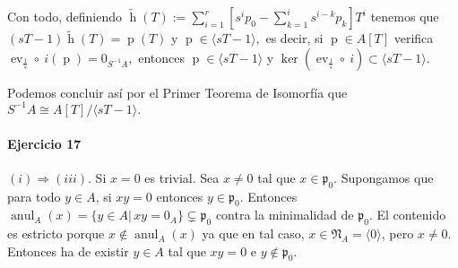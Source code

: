 \documentclass[./ejercicios.tex]{subfiles}
\begin{document}
Con todo, definiendo $\widetilde{\operatorname{h}}(T):=\sum_{i=1}^r\left[s^ip_0-\sum_{k=1}^is^{i-k}p_k\right]T^i$ tenemos que $(sT-1)\widetilde{\operatorname{h}}(T)=\operatorname{p}(T)$ y $\operatorname{p}\in\langle sT-1\rangle,$ es decir, si $\operatorname{p}\in A[T]$ verifica $\operatorname{ev}_{\frac{1}{s}}\circ\ i(\operatorname{p})=0_{S^{-1}A},$ entonces $\operatorname{p}\in \langle sT-1\rangle$ y $\ker(\operatorname{ev}_{\frac{1}{s}}\circ\ i)\subset\langle sT-1\rangle.$

Podemos concluir así por el Primer Teorema de Isomorfía que $S^{-1}A\cong A[T]/\langle sT-1\rangle.$
%
%
%
%
%

\paragraph{Ejercicio 17}
$(i)\Rightarrow (iii)$. Si $x = 0$ es trivial. Sea $x\neq 0$ tal que $x\in \mathfrak{p}_0$. Supongamos que para todo $y\in  A$, si $xy = 0$ entonces $y \in \mathfrak{p}_0$. Entonces $\operatorname{anul}_A(x) = \{y \in A \vert \, xy = 0_A\} \subsetneq \mathfrak{p}_0$ contra la minimalidad de $\mathfrak{p}_0$.
El contenido es estricto porque $x \not \in \operatorname{anul}_A(x)$ ya que en tal caso, $x \in \mathfrak{N}_A = \langle 0 \rangle$, pero $x \neq 0$.
Entonces ha de existir $y \in A$ tal que $xy = 0$ e $y\not \in \mathfrak{p}_0$.
\end{document}
